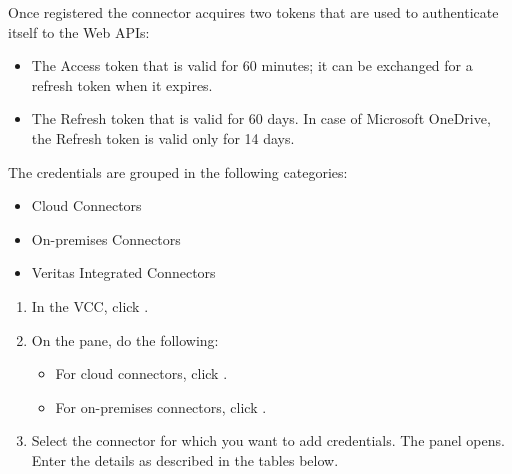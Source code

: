 \documentclass[letterpaper,10pt,english]{sphinxmanual}
\begin{document}
Once registered the connector acquires two tokens that are used to authenticate itself to the Web APIs:
\begin{itemize}
\item {} 
The Access token that is valid for 60 minutes; it can be exchanged for a refresh token when it expires.

\item {} 
The Refresh token that is valid for 60 days. In case of Microsoft OneDrive, the Refresh token is valid only for 14 days.

\end{itemize}

The credentials are grouped in the following categories:
\begin{itemize}
\item {} 
Cloud Connectors

\item {} 
On-premises Connectors

\item {} 
Veritas Integrated Connectors

\end{itemize}

\begin{enumerate}
\item {} 
In the VCC, click .

\item {} 
On the  pane, do the following:
\begin{itemize}
\item {} 
For cloud connectors, click  \sphinxstylestrong{\textgreater{}} .

\item {} 
For on-premises connectors, click  \sphinxstylestrong{\textgreater{}} .

\end{itemize}

\item {} 
Select the connector for which you want to add credentials.
The  panel opens. Enter the details as described in the tables below.

\begin{figure}[htbp]
\centering

\noindent{}
\end{figure}

\end{enumerate}
\end{document}
